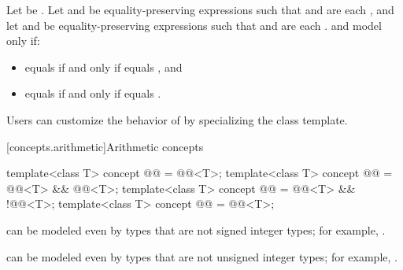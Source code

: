 \begin{itemdescr}
\pnum
Let  be .
Let  and  be
equality-preserving expressions such that
 and  are each , and
let  and  be equality-preserving expressions such that
 and  are each .
 and  model 
only if:
\begin{itemize}
\item {} equals  if and only if
   equals , and
\item {} equals  if and only if
   equals .
\end{itemize}

\pnum
\begin{note}
Users can customize the behavior of  by specializing the
 class template.
\end{note}
\end{itemdescr}

[concepts.arithmetic]{Arithmetic concepts}

\begin{itemdecl}
template<class T>
  concept @@ = @@<T>;
template<class T>
  concept @@ = @@<T> && @@<T>;
template<class T>
  concept @@ = @@<T> && !@@<T>;
template<class T>
  concept @@ = @@<T>;
\end{itemdecl}

\begin{itemdescr}
\pnum
\begin{note}
 can be modeled even by types that are
not signed integer types; for example, .
\end{note}

\pnum
\begin{note}
 can be modeled even by types that are
not unsigned integer types; for example, .
\end{note}
\end{itemdescr}

